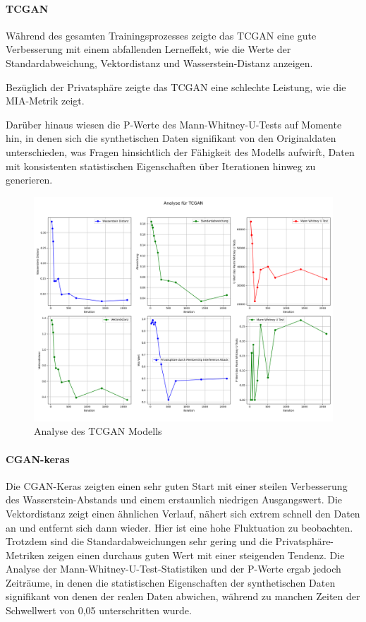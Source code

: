 \paragraph{\textbf{TCGAN}}
Während des gesamten Trainingsprozesses zeigte das TCGAN eine gute Verbesserung mit einem abfallenden Lerneffekt, wie die Werte der Standardabweichung, Vektordistanz und Wasserstein-Distanz anzeigen.

Bezüglich der Privatsphäre zeigte das TCGAN eine schlechte Leistung, wie die \ac{MIA}-Metrik zeigt.

Darüber hinaus wiesen die P-Werte des Mann-Whitney-U-Tests auf Momente hin, in denen sich die synthetischen Daten signifikant von den Originaldaten unterschieden, was Fragen hinsichtlich der Fähigkeit des Modells aufwirft,
Daten mit konsistenten statistischen Eigenschaften über Iterationen hinweg zu generieren.
\begin{figure}[ht]
    \centering
    \includegraphics[width=1\textwidth]{includes/figures/graphs/TCGAN_analysis.png}
    \caption{Analyse des TCGAN Modells}
    \label{fig:graphs_tcgan_analysis}
\end{figure}


\paragraph{\textbf{CGAN-keras}}
Die CGAN-Keras zeigten einen sehr guten Start mit einer steilen Verbesserung des Wasserstein-Abstands und einem erstaunlich niedrigen Ausgangswert. Die Vektordistanz zeigt einen ähnlichen Verlauf, nähert sich extrem schnell den Daten an und
entfernt sich dann wieder. Hier ist eine hohe Fluktuation zu beobachten. Trotzdem sind die Standardabweichungen sehr gering und die Privatsphäre-Metriken zeigen einen durchaus guten Wert mit einer steigenden Tendenz.
Die Analyse der Mann-Whitney-U-Test-Statistiken und der P-Werte ergab jedoch Zeiträume, in denen die statistischen Eigenschaften der synthetischen Daten signifikant von denen der realen Daten abwichen, während zu manchen Zeiten der Schwellwert von 0,05 unterschritten wurde.

